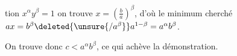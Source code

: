 %
tion $x^\alpha y^\beta=1$ on trouve $x=\left(\frac ba\right)^\beta$, d'où  le minimum cherché $ax=b^\beta\deleted{\unsure{/a^\beta}}a^{1-\beta}=a^\alpha b^\beta$.

On trouve donc $c<a^\alpha b^\beta$, ce qui achève la démonstration.
